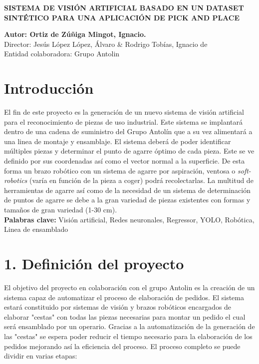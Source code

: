 {\setlength{\parindent}{0pt}
\begin{Large}
\textbf{SISTEMA DE VISIÓN ARTIFICIAL BASADO EN UN DATASET SINTÉTICO PARA UNA APLICACIÓN DE PICK AND PLACE}
\end{Large}

\textbf{Autor: Ortiz de Zúñiga Mingot, Ignacio.} \\
Director: Jesús López López, Álvaro \& Rodrigo Tobías, Ignacio de \\
Entidad colaboradora: Grupo Antolin \\

\section*{Introducción}
El fin de este proyecto es la generación de un nuevo sistema de visión artificial para el reconocimiento de piezas de uso industrial. Este sistema se implantará dentro de una cadena de suministro del Grupo Antolín\textsuperscript{\textregistered} que a su vez alimentará a una linea de montaje y ensamblaje. El sistema deberá de poder identificar múltiples piezas y determinar el punto de agarre óptimo de cada pieza. Este se ve definido por sus coordenadas así como el vector normal a la superficie. De esta forma un brazo robótico con un sistema de agarre por aspiración, ventosa o \textit{soft-robotics} (varía en función de la pieza a coger) podrá recolectarlas. La multitud de herramientas de agarre así como de la necesidad de un sistema de determinación de puntos de agarre se debe a la gran variedad de piezas existentes con formas y tamaños de gran variedad (1-30 cm).\\
\textbf{Palabras clave:} Visión artificial, Redes neuronales, Regressor, YOLO, Robótica, Linea de ensamblado

\section*{1. Definición del proyecto}
El objetivo del proyecto en colaboración con el grupo Antolin es la creación de un sistema capaz de automatizar el proceso de elaboración de pedidos. El sistema estará constituido por sistemas de visión y brazos robóticos encargados de elaborar "cestas" con todas las piezas necesarias para montar un pedido el cual será ensamblado por un operario. Gracias a la automatización de la generación de las "cestas" se espera poder reducir el tiempo necesario para la elaboración de los pedidos mejorando así la eficiencia del proceso. El proceso completo se puede dividir en varias etapas:

}
